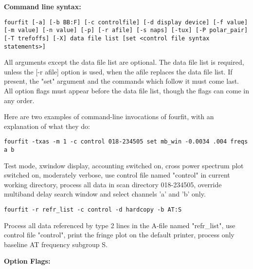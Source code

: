 
\textbf{Command line syntax:}

\texttt{fourfit [-a] [-b BB:F] [-c controlfile] [-d display device]
            [-f value] [-m value] [-n value] [-p] [-r afile] [-s naps]
            [-tux] [-P polar\_pair] [-T trefoffs] [-X] data file list 
            [set <control file syntax statements>]}

         All arguments except the data file list are optional.
         The data file list is required, unless the
         [-r afile] option is used, when the afile replaces 
         the data file list. If present,
         the "set" argument and the commands which follow it must
         come last.  All option flags must appear before the data file
         list, though the flags can come in any order.

    Here are two examples of command-line invocations of fourfit, with
    an explanation of what they do:

\texttt{fourfit -txas -m 1 -c control 018-234505 set mb\_win -0.0034 .004 freqs a b}

        Test mode, xwindow display, accounting switched on, cross
        power spectrum plot switched on, moderately verbose, use
        control file named "control" in current working directory,
        process all data in scan directory 018-234505, override
        multiband delay search window and select channels 'a' and
        'b' only.

\texttt{fourfit -r refr\_list -c control -d hardcopy -b AT:S}

        Process all data referenced by type 2 lines in the A-file
        named "refr\_list", use control file "control", print the
        fringe plot on the default printer, process only baseline
        AT frequency subgroup S.

\textbf{Option Flags:}

